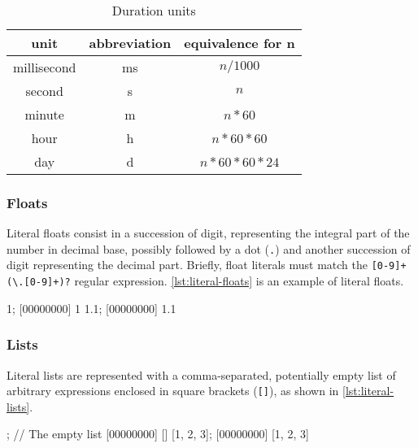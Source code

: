 \begin{table}[\floatpos]
  \centering
  \begin{tabular}{|c|c|c|}
    \hline
    unit        & abbreviation & equivalence for n         \\
    \hline
    millisecond & ms           & $n / 1000$         \\
    second      & s            & $n$                \\
    minute      & m            & $n * 60$           \\
    hour        & h            & $n * 60 * 60$      \\
    day         & d            & $n * 60 * 60 * 24$ \\
    \hline
  \end{tabular}
  \caption{Duration units}
  \label{tab:durations}
\end{table}

\subsubsection{Floats}
\label{sec:us-syn-lit-float}

Literal floats consist in a succession of digit, representing the
integral part of the number in decimal base, possibly followed by a
dot (\lstinline|.|) and another succession of digit representing the
decimal part. Briefly, float literals must match the
\lstinline|[0-9]+(\.[0-9]+)?| regular expression. \autoref{lst:literal-floats}
is an example of literal floats.

\begin{urbiscript}[caption=Literal floats,label=lst:literal-floats,float=\floatpos]
1;
[00000000] 1
1.1;
[00000000] 1.1
\end{urbiscript}

\subsubsection{Lists}
\label{sec:us-syn-lit-list}

Literal lists are represented with a comma-separated, potentially
empty list of arbitrary expressions enclosed in square brackets
(\lstinline|[]|), as shown in \autoref{lst:literal-lists}.

\begin{urbiscript}[caption=Literal lists,label=lst:literal-lists,float=\floatpos]
[]; // The empty list
[00000000] []
[1, 2, 3];
[00000000] [1, 2, 3]
\end{urbiscript}

